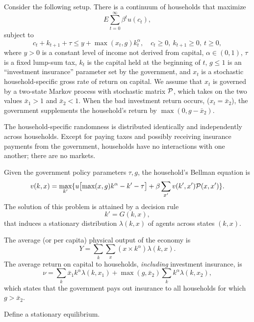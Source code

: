  
\medskip
\noindent
Consider the following setup.
There is a continuum of households that maximize
$$ E \sum_{t=0}^\infty \beta^t u(c_t) ,$$
subject to
$$ c_t + k_{t+1} + \tau \leq y + \max(x_t,g) k_t^\alpha , \quad
           c_t \geq 0,\ k_{t+1}\geq 0,\ t \geq 0, $$
where $y> 0$ is a constant level of income not derived from capital,
$\alpha \in (0,1)$, $\tau$ is a fixed lump-sum tax, $k_t$ is the
capital held at the beginning of $t$, $g \leq 1$ is an ``investment
insurance'' parameter set by the government, and $x_t$ is a
stochastic household-specific gross rate of return on capital.
We assume that $x_t$ is governed by a two-state Markov process
with stochastic matrix $\cal P$, which takes on the two values
$\bar x_1 > 1$ and $\bar x_2 < 1$. When the bad investment return
occurs, ($x_t = \bar x_2$), the government supplements the
household's return by $\max(0, g - \bar x_2)$.

  The household-specific randomness is distributed identically and
independently across households. Except for paying taxes and possibly
receiving insurance payments from the government, households have
no interactions with one another; there are no markets.

  Given the government policy parameters $\tau, g$, the household's
Bellman equation is
$$ v(k,x) = \max_{k'} \{ u \bigl[ \max(x,g) k^\alpha - k' - \tau\bigr] +
\beta \sum_{x'} v(k',x') {\cal P} (x,x') \} .$$
The solution of this problem is attained by a decision rule
$$k' = G(k,x),$$
that induces a stationary distribution $\lambda(k,x)$ of agents across
states $(k,x)$.

  The average (or per capita) physical output of the economy is
$$ Y = \sum_k \sum_x (x \times k^\alpha) \lambda(k,x) .$$
The average return on capital to households, {\it including\/}
 investment insurance, is
$$ \nu = \sum_k \bar x_1 k^\alpha \lambda(k,x_1) +
\max(g,\bar x_2) \sum_k k^\alpha \lambda(k,x_2) ,$$
which states that the government pays out
insurance to all households for which $g > \bar x_2$.

Define a stationary equilibrium.


